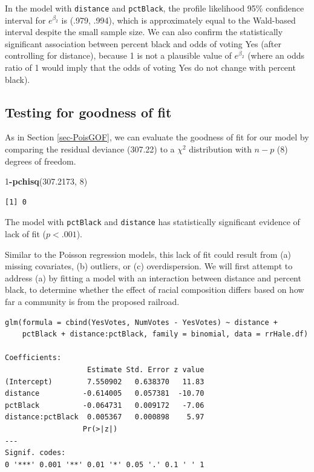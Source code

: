 \documentclass[
]{krantz}
\newenvironment{Shaded}{\begin{snugshade}}{\end{snugshade}}
\newcommand{\DecValTok}[1]{\textcolor[rgb]{0.06,0.06,0.06}{#1}}
\newcommand{\FloatTok}[1]{\textcolor[rgb]{0.06,0.06,0.06}{#1}}
\newcommand{\KeywordTok}[1]{\textcolor[rgb]{0.27,0.27,0.27}{\textbf{#1}}}
\newcommand{\NormalTok}[1]{#1}
\newcommand{\OperatorTok}[1]{\textcolor[rgb]{0.43,0.43,0.43}{\textbf{#1}}}
\begin{document}
In the model with \texttt{distance} and \texttt{pctBlack}, the profile likelihood 95\% confidence interval for \(e^{\beta_2}\) is (.979, .994), which is approximately equal to the Wald-based interval despite the small sample size. We can also confirm the statistically significant association between percent black and odds of voting Yes (after controlling for distance), because 1 is not a plausible value of \(e^{\beta_2}\) (where an odds ratio of 1 would imply that the odds of voting Yes do not change with percent black).

\hypertarget{testing-for-goodness-of-fit}{%
\subsection{Testing for goodness of fit}\label{testing-for-goodness-of-fit}}

As in Section \ref{sec-PoisGOF}, we can evaluate the goodness of fit for our model by comparing the residual deviance (307.22) to a \(\chi^2\) distribution with \(n-p\) (8) degrees of freedom.

\begin{Shaded}
\begin{Highlighting}[]
\DecValTok{1}\OperatorTok{-}\KeywordTok{pchisq}\NormalTok{(}\FloatTok{307.2173}\NormalTok{, }\DecValTok{8}\NormalTok{)}
\end{Highlighting}
\end{Shaded}

\begin{verbatim}
[1] 0
\end{verbatim}

The model with \texttt{pctBlack} and \texttt{distance} has statistically significant evidence of lack of fit (\(p<.001\)).

Similar to the Poisson regression models, this lack of fit could result from (a) missing covariates, (b) outliers, or (c) overdispersion. We will first attempt to address (a) by fitting a model with an interaction between distance and percent black, to determine whether the effect of racial composition differs based on how far a community is from the proposed railroad.

\begin{verbatim}
glm(formula = cbind(YesVotes, NumVotes - YesVotes) ~ distance + 
    pctBlack + distance:pctBlack, family = binomial, data = rrHale.df)

Coefficients:
                   Estimate Std. Error z value
(Intercept)        7.550902   0.638370   11.83
distance          -0.614005   0.057381  -10.70
pctBlack          -0.064731   0.009172   -7.06
distance:pctBlack  0.005367   0.000898    5.97
                  Pr(>|z|)    
---
Signif. codes:  
0 '***' 0.001 '**' 0.01 '*' 0.05 '.' 0.1 ' ' 1
\end{verbatim}
\end{document}
